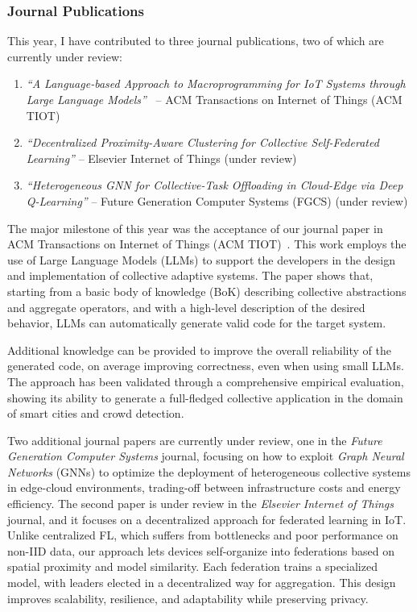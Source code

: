 \documentclass[runningheads]{llncs}
\begin{document}
\subsubsection{Journal Publications}
This year, I have contributed to three journal publications,
two of which are currently under review:

\begin{enumerate}
    \item \textit{``A Language-based Approach to Macroprogramming for IoT Systems through Large Language Models''}~\cite{10.1145/3758326} -- ACM Transactions on Internet of Things (ACM TIOT)
    \item \textit{``Decentralized Proximity-Aware Clustering for Collective Self-Federated Learning''} -- Elsevier Internet of Things (under review)
    \item \textit{``Heterogeneous GNN for Collective-Task Offloading in Cloud-Edge via Deep Q-Learning''} -- Future Generation Computer Systems (FGCS) (under review)
\end{enumerate}

The major milestone of this year was the acceptance of our journal paper in ACM Transactions on Internet of Things (ACM TIOT)~\cite{10.1145/3758326}.
%
This work employs the use of Large Language Models (LLMs) to support the developers in the design and implementation of collective adaptive systems.
%
The paper shows that, starting from a basic body of knowledge (BoK) describing collective abstractions and aggregate operators,
and with a high-level description of the desired behavior,
LLMs can automatically generate valid code for the target system.

Additional knowledge can be provided to improve the overall reliability of the generated code,
on average improving correctness,
even when using small LLMs.
%
The approach has been validated through a comprehensive empirical evaluation,
showing its ability to generate a full-fledged collective application in the domain of smart cities and crowd detection.

Two additional journal papers are currently under review,
one in the \emph{Future Generation Computer Systems} journal,
focusing on how to exploit \emph{Graph Neural Networks} (GNNs) to optimize the deployment of heterogeneous collective systems in edge-cloud environments,
trading-off between infrastructure costs and energy efficiency.
%
The second paper is under review in the \emph{Elsevier Internet of Things} journal,
and it focuses on a decentralized approach for federated learning in IoT.
%
Unlike centralized FL,
which suffers from bottlenecks and poor performance on non-IID data,
our approach lets devices self-organize into federations based on spatial proximity and model similarity.
%
Each federation trains a specialized model,
with leaders elected in a decentralized way for aggregation.
%
This design improves scalability, resilience, and adaptability while preserving privacy.
\end{document}
